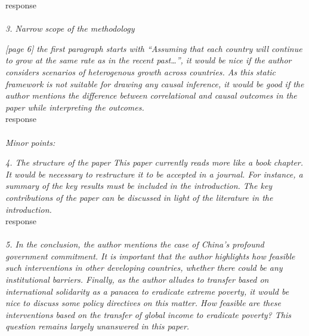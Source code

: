 \documentclass[12pt,english]{article}
\begin{document}
response
~\\ ~\\

\textit{3.	Narrow scope of the methodology}

\textit{[page 6] the first paragraph starts with “Assuming that each country will continue to grow at the same rate as in the recent past…”, it would be nice if the author considers scenarios of heterogenous growth across countries. As this static framework is not suitable for drawing any causal inference, it would be good if the author mentions the difference between correlational and causal outcomes in the paper while interpreting the outcomes. }~\\

response
~\\ ~\\

\textit{Minor points:}
 
\textit{4.	The structure of the paper}
\textit{This paper currently reads more like a book chapter. It would be necessary to restructure it to be accepted in a journal. For instance, a summary of the key results must be included in the introduction. The key contributions of the paper can be discussed in light of the literature in the introduction.}~\\

response
~\\ ~\\

\textit{5. In the conclusion, the author mentions the case of China's profound government commitment. It is important that the author highlights how feasible such interventions in other developing countries, whether there could be any institutional barriers. Finally, as the author alludes to transfer based on international solidarity as a panacea to eradicate extreme poverty, it would be nice to discuss some policy directives on this matter. How feasible are these interventions based on the transfer of global income to eradicate poverty? This question remains largely unanswered in this paper.}~\\


~\\ ~\\

\clearpage 
\renewcommand{\url}[1]{\href{#1}{Link}} 
%  
% 
\end{document}
